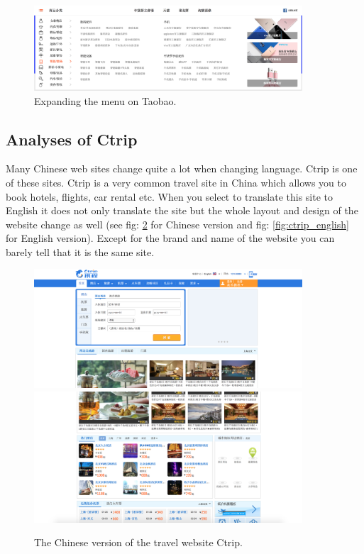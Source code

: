 \begin{figure}[h]
\centering
\includegraphics[width=100mm]{Images/Taobao_menu}
\decoRule
\caption[Taobao' menu bar]{Expanding the menu on Taobao.}
\label{fig:taobao_menu}
\end{figure}

\subsection{Analyses of Ctrip}
Many Chinese web sites change quite a lot when changing language. Ctrip is one of these sites. Ctrip is a very common travel site in China which allows you to book hotels, flights, car rental etc. When you select to translate this site to English it does not only translate the site but the whole layout and design of the website change as well (see  fig: \ref{fig:ctrip_chinese} for Chinese version and fig: \ref{fig:ctrip_english} for English version). Except for the brand and name of the website you can barely tell that it is the same site.

\begin{figure}[h]
\centering
\includegraphics[width=100mm]{Images/ctrip_chinese1}
\includegraphics[width=100mm]{Images/ctrip_chinese2}
\decoRule
\caption[Chinese version of Ctrip]{The Chinese version of the travel website Ctrip.}
\label{fig:ctrip_chinese}
\end{figure}

